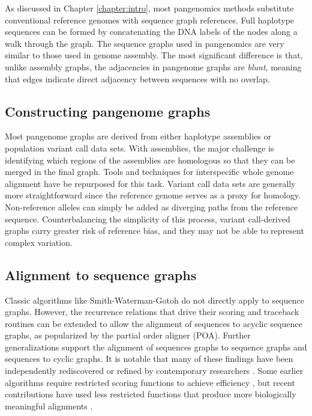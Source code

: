 \documentclass[11pt]{ucthesis}
\begin{document}
As discussed in Chapter \ref{chapter:intro}, most pangenomics methods substitute conventional reference genomes with sequence graph references. Full haplotype sequences can be formed by concatenating the DNA labels of the nodes along a walk through the graph. The sequence graphs used in pangenomics are very similar to those used in genome assembly. The most significant difference is that, unlike assembly graphs, the adjacencies in pangenome graphs are \emph{blunt}, meaning that edges indicate direct adjacency between sequences with no overlap.

\subsection{Constructing pangenome graphs}

Most pangenome graphs are derived from either haplotype assemblies or population variant call data sets. With assemblies, the major challenge is identifying which regions of the assemblies are homologous so that they can be merged in the final graph. Tools and techniques for interspecific whole genome alignment have be repurposed for this task\cite{armstrong2020progressive,li2020design,minkin2020scalable}. Variant call data sets are generally more straightforward since the reference genome serves as a proxy for homology. Non-reference alleles can simply be added as diverging paths from the reference sequence\cite{rakocevic2019fast,garrison2018variation}. Counterbalancing the simplicity of this process, variant call-derived graphs carry greater risk of reference bias, and they may not be able to represent complex variation.

\subsection{Alignment to sequence graphs}

Classic algorithms like Smith-Waterman-Gotoh\cite{smith1981comparison} do not directly apply to sequence graphs.
However, the recurrence relations that drive their scoring and traceback routines can be extended to allow the alignment of sequences to acyclic sequence graphs, as popularized by the partial order aligner (POA)\cite{lee2002multiple}.
Further generalizations support the alignment of sequences graphs to sequence graphs\cite{grasso2004combining} and sequences to cyclic graphs\cite{navarro2000improved,myers1989approximate,amir1997pattern}.
It is notable that many of these findings have been independently rediscovered or refined by contemporary researchers \cite{antipov2015hybridspades,rautiainen2017aligning,jain2020complexity}.
Some earlier algorithms require restricted scoring functions to achieve efficiency \cite{rautiainen2017aligning}, but recent contributions have used less restricted functions that produce more biologically meaningful alignments \cite{jain2020complexity}.
\end{document}

